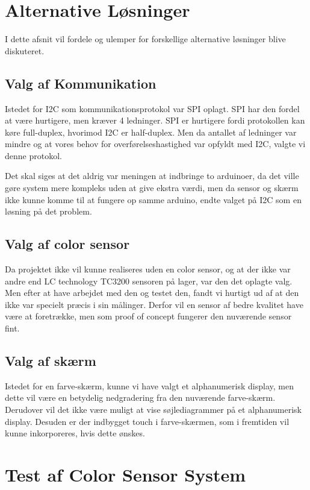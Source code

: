 \graphicspath{{Chapters/Alternative_Loesninger/}}


\section{Alternative Løsninger}
I dette afsnit vil fordele og ulemper for forskellige alternative løsninger blive diskuteret.

\subsection{Valg af Kommunikation}
Istedet for I2C som kommunikationsprotokol var SPI oplagt. SPI har den fordel at være hurtigere, men kræver 4 ledninger. SPI er hurtigere fordi protokollen kan køre full-duplex, hvorimod I2C er half-duplex. Men da antallet af ledninger var mindre og at vores behov for overførelseshastighed var opfyldt med I2C, valgte vi denne protokol.

Det skal siges at det aldrig var meningen at indbringe to arduinoer, da det ville gøre system mere kompleks uden at give ekstra værdi, men da sensor og skærm ikke kunne komme til at fungere op samme arduino, endte valget på I2C som en løsning på det problem.

\subsection{Valg af color sensor}
Da projektet ikke vil kunne realiseres uden en color sensor, og at der ikke var andre end LC technology TC3200 sensoren på lager, var den det oplagte valg. Men efter at have arbejdet med den og testet den, fandt vi hurtigt ud af at den ikke var specielt præcis i sin målinger. Derfor vil en sensor af bedre kvalitet have være at foretrække, men som proof of concept fungerer den nuværende sensor fint. 

\subsection{Valg af skærm}
Istedet for en farve-skærm, kunne vi have valgt et alphanumerisk display, men dette vil være en betydelig nedgradering fra den nuværende farve-skærm. Derudover vil det ikke være muligt at vise søjlediagrammer på et alphanumerisk display. Desuden er der indbygget touch i farve-skærmen, som i fremtiden vil kunne inkorporeres, hvis dette ønskes.


\section{Test af Color Sensor System}
